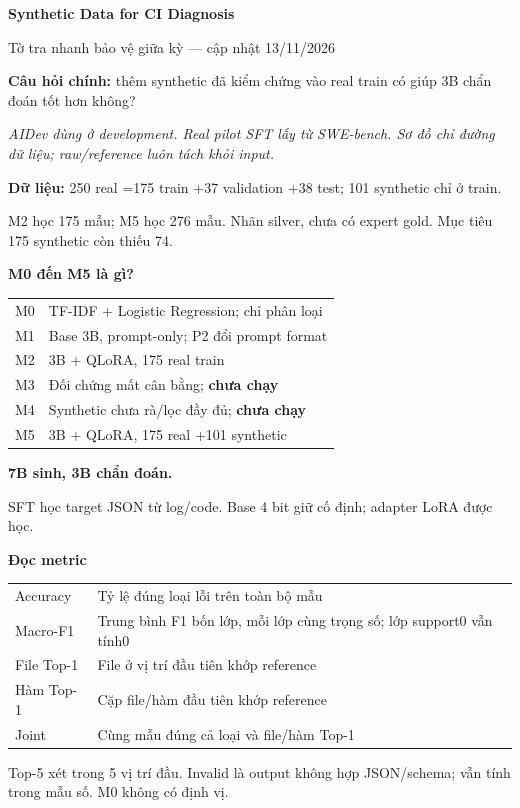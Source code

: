 \documentclass[10pt,a4paper]{article}
\begin{document}
\begin{center}
{\Large\bfseries Synthetic Data for CI Diagnosis}\par
{\small Tờ tra nhanh bảo vệ giữa kỳ — cập nhật 13/11/2026}
\end{center}
\textbf{Câu hỏi chính:} thêm synthetic đã kiểm chứng vào real train có giúp 3B chẩn đoán tốt hơn không?

\begin{center}\resizebox{.98\linewidth}{!}{}\end{center}
\textit{AIDev dùng ở development. Real pilot SFT lấy từ SWE-bench. Sơ đồ chỉ đường dữ liệu; raw/reference luôn tách khỏi input.}

\textbf{Dữ liệu:} 250 real =175 train +37 validation +38 test; 101 synthetic chỉ ở train.\par
M2 học 175 mẫu; M5 học 276 mẫu. Nhãn silver, chưa có expert gold. Mục tiêu 175 synthetic còn thiếu 74.

\begin{minipage}[t]{.47\linewidth}
\textbf{M0 đến M5 là gì?}\par
\begin{tabularx}{\linewidth}{@{}lX@{}}\toprule
M0 & TF-IDF + Logistic Regression; chỉ phân loại\\
M1 & Base 3B, prompt-only; P2 đổi prompt format\\
M2 & 3B + QLoRA, 175 real train\\
M3 & Đối chứng mất cân bằng; \textbf{chưa chạy}\\
M4 & Synthetic chưa rà/lọc đầy đủ; \textbf{chưa chạy}\\
M5 & 3B + QLoRA, 175 real +101 synthetic\\\bottomrule
\end{tabularx}
\smallskip
\textbf{7B sinh, 3B chẩn đoán.}\par
SFT học target JSON từ log/code. Base 4 bit giữ cố định; adapter LoRA được học.
\end{minipage}\hfill
\begin{minipage}[t]{.50\linewidth}
\textbf{Đọc metric}\par
\begin{tabularx}{\linewidth}{@{}lX@{}}\toprule
Accuracy & Tỷ lệ đúng loại lỗi trên toàn bộ mẫu\\
Macro-F1 & Trung bình F1 bốn lớp, mỗi lớp cùng trọng số; lớp support0 vẫn tính0\\
File Top-1 & File ở vị trí đầu tiên khớp reference\\
Hàm Top-1 & Cặp file/hàm đầu tiên khớp reference\\
Joint & Cùng mẫu đúng cả loại và file/hàm Top-1\\\bottomrule
\end{tabularx}
\smallskip
Top-5 xét trong 5 vị trí đầu. Invalid là output không hợp JSON/schema; vẫn tính trong mẫu số. M0 không có định vị.
\end{minipage}
\end{document}
